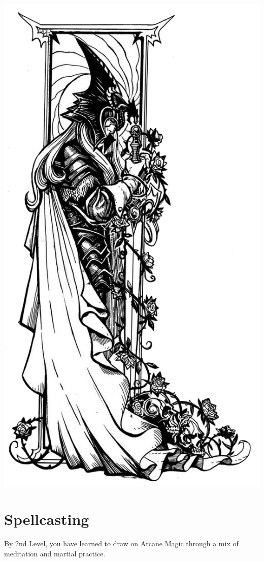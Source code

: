 \begin{multicols*}{2}
\begin{Figure}
\centering
\includegraphics[width=\textwidth]{img/elric.png}
\end{Figure}


\section*{Spellcasting}
By 2nd Level, you have learned to draw on Arcane Magic through a mix of meditation and martial practice. 



\end{multicols*}
